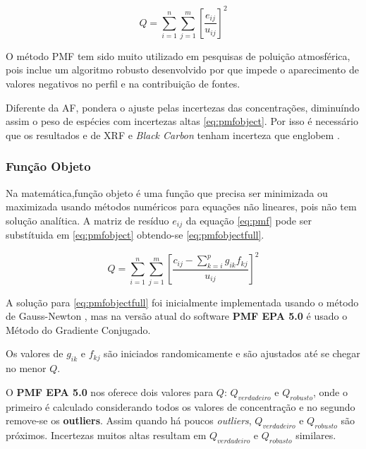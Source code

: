 \begin{equation}
  Q = \sum_{i=1}^n \sum_{j=1}^m  \left[ \frac{e_{ij}} {u_{ij}} \right] ^2
  \label{eq:pmfobject}
\end{equation}

O método PMF tem sido muito utilizado em pesquisas de poluição 
atmosférica, pois inclue um algoritmo robusto desenvolvido por \citep{paatero1994}
que impede o aparecimento de valores negativos no perfil e na contribuição de fontes.

Diferente da AF, pondera o ajuste pelas incertezas das concentrações, 
diminuíndo assim o peso de espécies com incertezas altas \ref{eq:pmfobject}.
Por isso é necessário que os resultados e de XRF e \textit{Black Carbon}
tenham incerteza que englobem .

\subsubsection{Função Objeto}

Na matemática,função objeto é uma função que precisa ser minimizada 
ou maximizada usando métodos numéricos para equações não lineares, pois não 
tem solução analítica. A matriz de resíduo ${e_{ij}}$ da equação \ref{eq:pmf}
pode ser substítuida em \ref{eq:pmfobject} obtendo-se \ref{eq:pmfobjectfull}.

\begin{equation}
  Q = \sum_{i=1}^n \sum_{j=1}^m  \left[ \frac{c_{ij} - \sum_{k=i}^p g_{ik}f_{kj}} {u_{ij}} \right] ^2
  \label{eq:pmfobjectfull}
\end{equation}

A solução para \ref{eq:pmfobjectfull} foi inicialmente implementada usando 
o método de Gauss-Newton \citep{paatero1994}, mas na 
versão atual do software \textbf{PMF EPA 5.0} \citep{norris2014} é usado o Método do Gradiente Conjugado.

Os valores de $g_{ik}$ e $f_{kj}$ são iniciados randomicamente e
são ajustados até se chegar no menor $Q$.
 
O \textbf{PMF EPA 5.0} nos oferece dois valores para $Q$: $Q_{verdadeiro}$ e 
$Q_{robusto}$, onde o primeiro é calculado considerando todos os valores 
de concentração e no segundo remove-se os \textbf{outliers}.
Assim quando há poucos \textit{outliers}, $Q_{verdadeiro}$ e $Q_{robusto}$ 
são próximos. Incertezas muitos altas resultam em $Q_{verdadeiro}$ e 
$Q_{robusto}$ similares.


